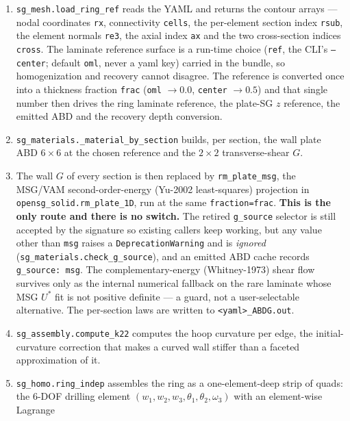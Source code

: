 \begin{enumerate}
\item \texttt{sg\_mesh.load\_ring\_ref} reads the YAML and returns the contour
      arrays --- nodal coordinates \texttt{rx}, connectivity \texttt{cells},
      the per-element section index \texttt{rsub}, the element normals
      \texttt{re3}, the axial index \texttt{ax} and the two cross-section
      indices \texttt{cross}. The laminate reference surface is a run-time
      choice (\texttt{ref}, the CLI's \texttt{--center}; default \texttt{oml},
      never a yaml key) carried in the bundle, so homogenization and recovery
      cannot disagree. The reference is converted once into a thickness
      fraction \texttt{frac} (\texttt{oml} $\rightarrow 0.0$, \texttt{center}
      $\rightarrow 0.5$) and that single number then drives the ring laminate
      reference, the plate-SG $z$ reference, the emitted ABD and the recovery
      depth conversion.
\item \texttt{sg\_materials.\_material\_by\_section} builds, per section, the
      wall plate ABD $6\times6$ at the chosen reference and the $2\times2$
      transverse-shear $G$.
\item The wall $G$ of every section is then replaced by
      \texttt{rm\_plate\_msg}, the MSG/VAM second-order-energy (Yu-2002
      least-squares) projection in \texttt{opensg\_solid.rm\_plate\_1D}, run
      at the same \texttt{fraction=frac}. \textbf{This is the only route and
      there is no switch.} The retired \texttt{g\_source} selector is still
      accepted by the signature so existing callers keep working, but any
      value other than \texttt{msg} raises a \texttt{DeprecationWarning} and
      is \emph{ignored} (\texttt{sg\_materials.check\_g\_source}), and an
      emitted ABD cache records \texttt{g\_source: msg}. The
      complementary-energy (Whitney-1973) shear flow survives only as the
      internal numerical fallback on the rare laminate whose MSG $U^{*}$ fit
      is not positive definite --- a guard, not a user-selectable
      alternative. The per-section laws are written to
      \texttt{<yaml>\_ABDG.out}.
\item \texttt{sg\_assembly.compute\_k22} computes the hoop curvature per edge,
      the initial-curvature correction that makes a curved wall stiffer than a
      faceted approximation of it.
\item \texttt{sg\_homo.ring\_indep} assembles the ring as a one-element-deep
      strip of quads: the 6-DOF drilling element
      $(w_1,w_2,w_3,\theta_1,\theta_2,\omega_3)$ with an element-wise Lagrange

\end{enumerate}
